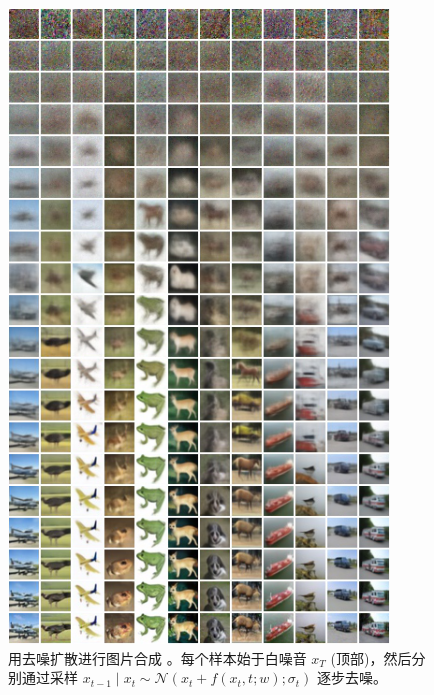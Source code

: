 \begin{figure}
    \centering
    \includegraphics[width=0.9\textwidth]{fig/fig7.2.png}
    \caption[去噪扩散]{用去噪扩散进行图片合成 \citep{arxiv-2006.11239}。每个样本始于白噪音 $x_T$ (顶部)，然后分别通过采样 $x_{t-1} \mid x_t \sim \mathcal{N} (x_t + f(x_t,t;w);\sigma_t)$ 逐步去噪。}
    \label{fig7.2}
\end{figure}